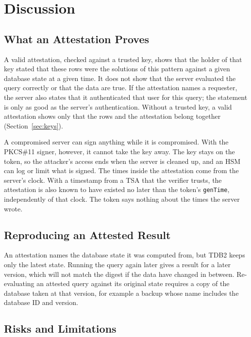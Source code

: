 \documentclass[11pt,a4paper]{article}
\newcommand{\code}[1]{\texttt{#1}}
\begin{document}
\section{Discussion}
\label{sec:discussion}

\subsection{What an Attestation Proves}
\label{sec:trust}

A valid attestation, checked against a trusted key, shows that the holder of that key stated
that these rows were the solutions of this pattern against a given database state at a given
time. It does not show that the server evaluated the query correctly or that the data are true.
If the attestation names a requester, the server also states that it authenticated that user
for this query; the statement is only as good as the server's authentication. Without a
trusted key, a valid attestation shows only that the rows and the attestation belong together
(Section~\ref{sec:keys}).

A compromised server can sign anything while it is compromised. With the PKCS\#11 signer,
however, it cannot take the key away. The key stays on the token, so the attacker's access ends
when the server is cleaned up, and an HSM can log or limit what is signed. The times inside the
attestation come from the server's clock. With a timestamp from a TSA that the verifier trusts,
the attestation is also known to have existed no later than the token's \code{genTime},
independently of that clock. The token says nothing about the times the server wrote.

\subsection{Reproducing an Attested Result}
\label{sec:reproduce}

An attestation names the database state it was computed from, but TDB2 keeps only the latest
state. Running the query again later gives a result for a later version, which will not match the
digest if the data have changed in between. Re-evaluating an attested query against its
original state requires a copy of the database taken at that version, for example a backup
whose name includes the database ID and version.

\subsection{Risks and Limitations}
\label{sec:risks}
\end{document}
